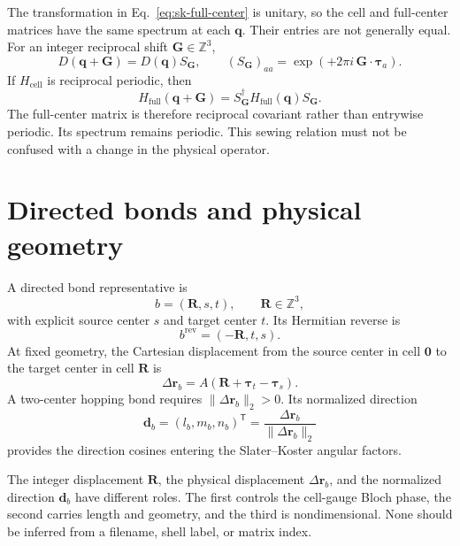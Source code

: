 The transformation in Eq.~\eqref{eq:sk-full-center} is unitary, so the cell and
full-center matrices have the same spectrum at each $\mathbf q$. Their entries
are not generally equal. For an integer reciprocal shift
$\mathbf G\in\mathbb Z^3$,
\begin{equation}
  D(\mathbf q+\mathbf G)=D(\mathbf q)S_{\mathbf G},
  \qquad
  (S_{\mathbf G})_{aa}
  =\exp(+2\pi i\,\mathbf G\cdot\boldsymbol\tau_a).
\end{equation}
If $H_{\mathrm{cell}}$ is reciprocal periodic, then
\begin{equation}
  H_{\mathrm{full}}(\mathbf q+\mathbf G)
  =
  S_{\mathbf G}^{\dagger}
  H_{\mathrm{full}}(\mathbf q)
  S_{\mathbf G}.
\end{equation}
The full-center matrix is therefore reciprocal covariant rather than
entrywise periodic. Its spectrum remains periodic. This sewing relation must
not be confused with a change in the physical operator.

\section{Directed bonds and physical geometry}

A directed bond representative is
\begin{equation}
  b=(\mathbf R,s,t),
  \qquad
  \mathbf R\in\mathbb Z^3,
\end{equation}
with explicit source center $s$ and target center $t$. Its Hermitian reverse is
\begin{equation}
  b^{\mathrm{rev}}=(-\mathbf R,t,s).
\end{equation}
At fixed geometry, the Cartesian displacement from the source center in cell
$\mathbf0$ to the target center in cell $\mathbf R$ is
\begin{equation}
  \Delta\mathbf r_b
  =
  A(\mathbf R+\boldsymbol\tau_t-\boldsymbol\tau_s).
  \label{eq:sk-bond-displacement}
\end{equation}
A two-center hopping bond requires
$\lVert\Delta\mathbf r_b\rVert_2>0$. Its normalized direction
\begin{equation}
  \mathbf d_b=(l_b,m_b,n_b)^{\mathsf T}
  =
  \frac{\Delta\mathbf r_b}
       {\lVert\Delta\mathbf r_b\rVert_2}
  \label{eq:sk-bond-direction}
\end{equation}
provides the direction cosines entering the Slater--Koster angular factors.

The integer displacement $\mathbf R$, the physical displacement
$\Delta\mathbf r_b$, and the normalized direction $\mathbf d_b$ have different
roles. The first controls the cell-gauge Bloch phase, the second carries length
and geometry, and the third is nondimensional. None should be inferred from a
filename, shell label, or matrix index.


